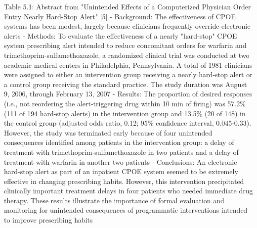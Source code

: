 Table 5.1: Abstract from "Unintended Effects of a Computerized Physician Order Entry Nearly Hard-Stop Alert" [5]
- Background: The effectiveness of CPOE systems has been modest, largely because clinicians frequently override electronic alerts
- Methods: To evaluate the effectiveness of a nearly "hard-stop" CPOE system prescribing alert intended to reduce concomitant orders for warfarin and trimethoprim-sulfamethoxazole, a randomized clinical trial was conducted at two academic medical centers in Philadelphia, Pennsylvania. A total of 1981 clinicians were assigned to either an intervention group receiving a nearly hard-stop alert or a control group receiving the standard practice. The study duration was August 9, 2006, through February 13, 2007
- Results: The proportion of desired responses (i.e., not reordering the alert-triggering drug within 10 min of firing) was 57.2\% (111 of 194 hard-stop alerts) in the intervention group and 13.5\% (20 of 148) in the control group (adjusted odds ratio, 0.12; 95\% confidence interval, 0.045-0.33). However, the study was terminated early because of four unintended consequences identified among patients in the intervention group: a delay of treatment with trimethoprim-sulfamethoxazole in two patients and a delay of treatment with warfarin in another two patients
- Conclusions: An electronic hard-stop alert as part of an inpatient CPOE system seemed to be extremely effective in changing prescribing habits. However, this intervention precipitated clinically important treatment delays in four patients who needed immediate drug therapy. These results illustrate the importance of formal evaluation and monitoring for unintended consequences of programmatic interventions intended to improve prescribing habits

